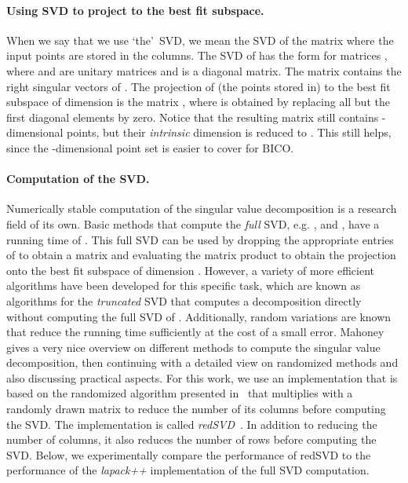 \documentclass[a4paper]{scrartcl}
\begin{document}
\paragraph*{Using SVD to project to the best fit subspace.}
When we say that we use \lq the\rq\ SVD, we mean the SVD of the matrix  where the input points are stored in the columns. The SVD of  has the form  for matrices , where  and  are unitary matrices and  is a diagonal matrix. The matrix  contains the right singular vectors of .
The projection of (the points stored in)  to the best fit subspace of dimension  is the matrix , where  is obtained by replacing all but the first  diagonal elements by zero. Notice that the resulting matrix still contains -dimensional points, but their \emph{intrinsic} dimension is reduced to . This still helps, since the -dimensional point set is easier to cover for BICO.

\paragraph*{Computation of the SVD.}
Numerically stable computation of the singular value decomposition is a research field of its own. Basic methods that compute the \emph{full} SVD, e.g. ,  and , have a running time of . This full SVD can be used by dropping the appropriate entries of  to obtain a matrix  and evaluating the matrix product  to obtain the projection onto the best fit subspace of dimension . However, a variety of more efficient algorithms have been developed for this specific task, which are known as algorithms for the \emph{truncated} SVD that computes a decomposition  directly without computing the full SVD of . Additionally, random variations are known that reduce the running time sufficiently at the cost of a small error.
Mahoney~\cite{M11} gives a very nice overview on different methods to compute the singular value decomposition, then continuing with a detailed view on randomized methods and also discussing practical aspects.
For this work, we use an implementation that is based on the randomized algorithm presented in~\cite{HMT11} that multiplies  with a randomly drawn matrix to reduce the number of its columns before computing the SVD. The implementation is called \emph{redSVD}~\cite{O11}. In addition to reducing the number of columns, it also reduces the number of rows before computing the SVD. Below, we experimentally compare the performance of redSVD to the performance of the \emph{lapack++} implementation of the full SVD computation.
\end{document}
